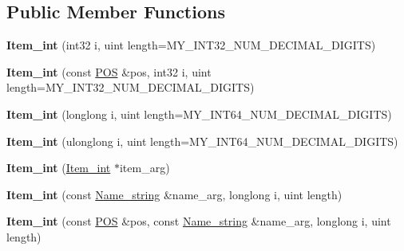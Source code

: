 \subsection*{Public Member Functions}
\begin{DoxyCompactItemize}
\item 
\mbox{\label{classItem__int_a9eac080a402265cf224a70216ac90c17}} 
{\bfseries Item\+\_\+int} (int32 i, uint length=M\+Y\+\_\+\+I\+N\+T32\+\_\+\+N\+U\+M\+\_\+\+D\+E\+C\+I\+M\+A\+L\+\_\+\+D\+I\+G\+I\+TS)
\item 
\mbox{\label{classItem__int_aa7ef3a61d3908d367b60dbbb9a11e02f}} 
{\bfseries Item\+\_\+int} (const \mbox{\hyperlink{structYYLTYPE}{P\+OS}} \&pos, int32 i, uint length=M\+Y\+\_\+\+I\+N\+T32\+\_\+\+N\+U\+M\+\_\+\+D\+E\+C\+I\+M\+A\+L\+\_\+\+D\+I\+G\+I\+TS)
\item 
\mbox{\label{classItem__int_a474084151820d57d532ca79fa09b59d7}} 
{\bfseries Item\+\_\+int} (longlong i, uint length=M\+Y\+\_\+\+I\+N\+T64\+\_\+\+N\+U\+M\+\_\+\+D\+E\+C\+I\+M\+A\+L\+\_\+\+D\+I\+G\+I\+TS)
\item 
\mbox{\label{classItem__int_ae50f1242571053ba459cbbe8c38ada12}} 
{\bfseries Item\+\_\+int} (ulonglong i, uint length=M\+Y\+\_\+\+I\+N\+T64\+\_\+\+N\+U\+M\+\_\+\+D\+E\+C\+I\+M\+A\+L\+\_\+\+D\+I\+G\+I\+TS)
\item 
\mbox{\label{classItem__int_a7af446c7616c4150c212b5546533c242}} 
{\bfseries Item\+\_\+int} (\mbox{\hyperlink{classItem__int}{Item\+\_\+int}} $\ast$item\+\_\+arg)
\item 
\mbox{\label{classItem__int_aefce16303106d41728770d6de07ce70b}} 
{\bfseries Item\+\_\+int} (const \mbox{\hyperlink{className__string}{Name\+\_\+string}} \&name\+\_\+arg, longlong i, uint length)
\item 
\mbox{\label{classItem__int_a7df1097a4f4da85e3595aac9c20ad9c8}} 
{\bfseries Item\+\_\+int} (const \mbox{\hyperlink{structYYLTYPE}{P\+OS}} \&pos, const \mbox{\hyperlink{className__string}{Name\+\_\+string}} \&name\+\_\+arg, longlong i, uint length)
\item 
\mbox{\label{classItem__int_abbef856b3822ecbe4fdbf5746a8bcf51}} 

\end{DoxyCompactItemize}
